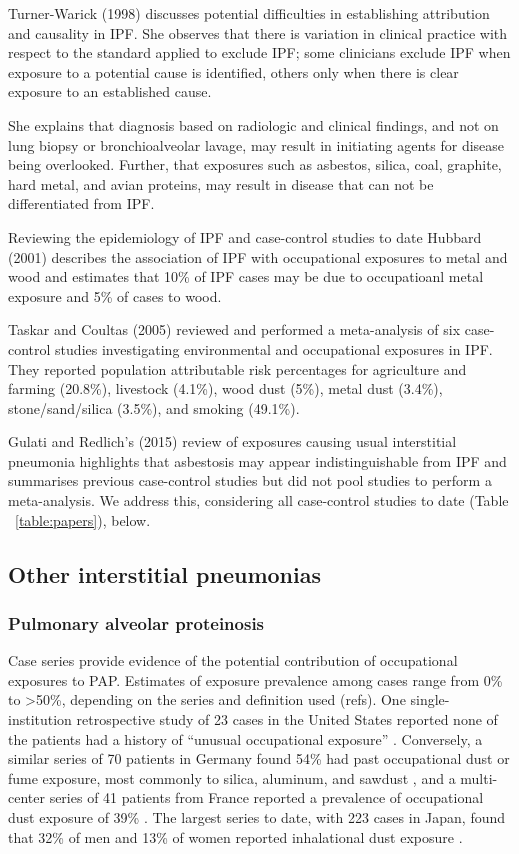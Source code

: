 \documentclass[a4paper,12pt]{article}
\begin{document}
Turner-Warick (1998)\cite{Turner-Warwick1998} discusses potential difficulties in establishing attribution and causality in IPF. She observes that there is variation in clinical practice with respect to the standard applied to exclude IPF; some clinicians exclude IPF when exposure to a potential cause is identified, others only when there is clear exposure to an established cause. 

She explains that diagnosis based on radiologic and clinical findings, and not on lung biopsy or bronchioalveolar lavage, may result in initiating agents for disease being overlooked. Further, that exposures such as asbestos, silica, coal, graphite, hard metal, and avian proteins, may result in disease that can not be differentiated from IPF.    

Reviewing the epidemiology of IPF and case-control studies to date Hubbard (2001)\cite{Hubbard2001} describes the association of IPF with occupational exposures to metal and wood and estimates that 10\% of IPF cases may be due to occupatioanl metal exposure and 5\% of cases to wood.    

Taskar and Coultas (2005)\cite{Taskar2006} reviewed and performed a meta-analysis of six case-control studies investigating environmental and occupational exposures in IPF. They reported population attributable risk percentages for agriculture and farming (20.8\%), livestock (4.1\%), wood dust (5\%), metal dust (3.4\%), stone/sand/silica (3.5\%), and smoking (49.1\%).

Gulati and Redlich's (2015)\cite{Gulati2015} review of exposures causing usual interstitial pneumonia highlights that asbestosis may appear indistinguishable from IPF and summarises previous case-control studies but did not pool studies to perform a meta-analysis. We address this, considering all case-control studies to date (Table ~\ref{table:papers}), below.  

\subsection{Other interstitial pneumonias}

\subsubsection{Pulmonary alveolar proteinosis}

Case series provide evidence of the potential contribution of occupational exposures to PAP.  Estimates of exposure prevalence among cases range from 0\% to >50\%, depending on the series and definition used (refs).  One single-institution retrospective study of 23 cases in the United States reported none of the patients had a history of “unusual occupational exposure” \cite{Kariman1984}.  Conversely, a similar series of 70 patients in Germany found 54\% had past occupational dust or fume
exposure, most commonly to silica, aluminum, and sawdust \cite{Bonella2011}, and a multi-center series of 41 patients from France reported a prevalence of occupational dust exposure of 39\% \cite{Briens2002}.  The largest series to date, with 223 cases in Japan, found that 32\% of men and 13\% of women reported inhalational dust exposure \cite{Inoue2008}.  
\end{document}
